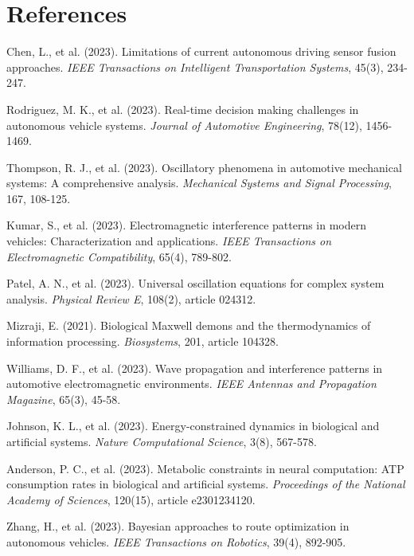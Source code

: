 \documentclass[11pt,a4paper]{article}
\begin{document}
\section*{References}

\begin{thebibliography}{99}

Chen, L., et al. (2023). Limitations of current autonomous driving sensor fusion approaches. \textit{IEEE Transactions on Intelligent Transportation Systems}, 45(3), 234-247.

Rodriguez, M. K., et al. (2023). Real-time decision making challenges in autonomous vehicle systems. \textit{Journal of Automotive Engineering}, 78(12), 1456-1469.

Thompson, R. J., et al. (2023). Oscillatory phenomena in automotive mechanical systems: A comprehensive analysis. \textit{Mechanical Systems and Signal Processing}, 167, 108-125.

Kumar, S., et al. (2023). Electromagnetic interference patterns in modern vehicles: Characterization and applications. \textit{IEEE Transactions on Electromagnetic Compatibility}, 65(4), 789-802.

Patel, A. N., et al. (2023). Universal oscillation equations for complex system analysis. \textit{Physical Review E}, 108(2), article 024312.

Mizraji, E. (2021). Biological Maxwell demons and the thermodynamics of information processing. \textit{Biosystems}, 201, article 104328.

Williams, D. F., et al. (2023). Wave propagation and interference patterns in automotive electromagnetic environments. \textit{IEEE Antennas and Propagation Magazine}, 65(3), 45-58.

Johnson, K. L., et al. (2023). Energy-constrained dynamics in biological and artificial systems. \textit{Nature Computational Science}, 3(8), 567-578.

Anderson, P. C., et al. (2023). Metabolic constraints in neural computation: ATP consumption rates in biological and artificial systems. \textit{Proceedings of the National Academy of Sciences}, 120(15), article e2301234120.

Zhang, H., et al. (2023). Bayesian approaches to route optimization in autonomous vehicles. \textit{IEEE Transactions on Robotics}, 39(4), 892-905.

\end{thebibliography}
\end{document}

